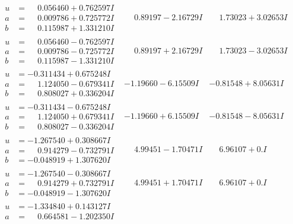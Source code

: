 \documentclass[1p]{elsarticle_modified}
\theoremstyle{definition}
\begin{document}
$$\begin{array}{c|c|c}
\begin{aligned}
u &= \phantom{-}0.056460 + 0.762597 I \\
a &= \phantom{-}0.009786 + 0.725772 I \\
b &= \phantom{-}0.115987 + 1.331210 I\end{aligned}
 & \phantom{-}0.89197 - 2.16729 I & \phantom{-}1.73023 + 3.02653 I \\ \hline\begin{aligned}
u &= \phantom{-}0.056460 - 0.762597 I \\
a &= \phantom{-}0.009786 - 0.725772 I \\
b &= \phantom{-}0.115987 - 1.331210 I\end{aligned}
 & \phantom{-}0.89197 + 2.16729 I & \phantom{-}1.73023 - 3.02653 I \\ \hline\begin{aligned}
u &= -0.311434 + 0.675248 I \\
a &= \phantom{-}1.124050 - 0.679341 I \\
b &= \phantom{-}0.808027 + 0.336204 I\end{aligned}
 & -1.19660 - 6.15509 I & -0.81548 + 8.05631 I \\ \hline\begin{aligned}
u &= -0.311434 - 0.675248 I \\
a &= \phantom{-}1.124050 + 0.679341 I \\
b &= \phantom{-}0.808027 - 0.336204 I\end{aligned}
 & -1.19660 + 6.15509 I & -0.81548 - 8.05631 I \\ \hline\begin{aligned}
u &= -1.267540 + 0.308667 I \\
a &= \phantom{-}0.914279 - 0.732791 I \\
b &= -0.048919 + 1.307620 I\end{aligned}
 & \phantom{-}4.99451 - 1.70471 I & \phantom{-}6.96107 + 0. I\phantom{ +0.000000I} \\ \hline\begin{aligned}
u &= -1.267540 - 0.308667 I \\
a &= \phantom{-}0.914279 + 0.732791 I \\
b &= -0.048919 - 1.307620 I\end{aligned}
 & \phantom{-}4.99451 + 1.70471 I & \phantom{-}6.96107 + 0. I\phantom{ +0.000000I} \\ \hline\begin{aligned}
u &= -1.334840 + 0.143127 I \\
a &= \phantom{-}0.664581 - 1.202350 I \\

\end{aligned}
\end{array}$$
\end{document}
